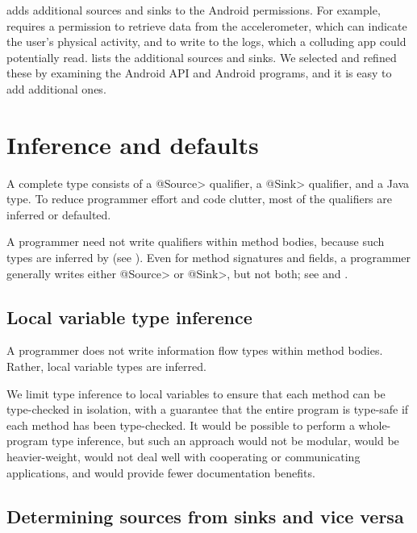 \TheFlowChecker adds additional sources and sinks to the Android permissions.
For example, \theFlowChecker requires 
a permission to retrieve data from the accelerometer, which can indicate the user's
physical activity, and to write to the logs, which a colluding app could potentially read.
 lists
the additional sources and sinks.
We selected and refined these by examining the Android
API and Android programs, and it is easy to add additional ones.





  \section{Inference and defaults}
 \label{sec:system:defaults}
 
 A complete type consists of a \<@Source> qualifier, a \<@Sink> qualifier,
 and a Java type.  To reduce programmer effort and code clutter, most of the
 qualifiers are inferred or defaulted.  
 
 A programmer need not write qualifiers within method bodies,
 because such types are inferred by \theFlowChecker (see ).
 Even for method signatures and
 fields, a programmer generally writes either \<@Source> or
 \<@Sink>, but not both; see  and 
.

\subsection{Local variable type inference}
\label{sec:type-inference}

A programmer does not write information flow types within method bodies.  Rather, local
variable types are inferred.

We limit type inference to local variables to ensure that
each method can be type-checked in isolation,
with a guarantee that the entire program is type-safe if each method has
been type-checked.  It would be possible to perform a whole-program type
inference, but such an approach would not be modular, would be
heavier-weight, would not deal well with cooperating or communicating
applications, and would provide fewer documentation benefits.  


\subsection{Determining sources from sinks and vice versa}
\label{sec:infer-from-flow-policy}

